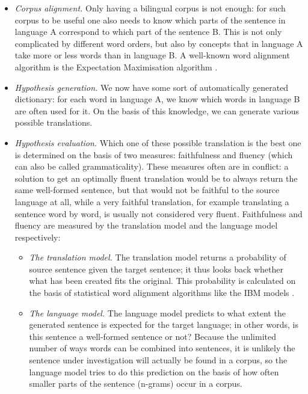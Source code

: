 \documentclass[12pt]{article}
\begin{document}
\begin{itemize}
\item \emph{Corpus alignment.} Only having a bilingual corpus is not enough: for such corpus to be useful one also needs to know which parts of the sentence in language A correspond to which part of the sentence B. This is not only complicated by different word orders, but also by concepts that in language A take more or less words than in language B. A well-known word alignment algorithm is the Expectation Maximisation algorithm \citep{dempster77}. 


\item \emph{Hypothesis generation.} We now have some sort of automatically generated dictionary: for each word in language A, we know which words in language B are often used for it. On the basis of this knowledge, we can generate various possible translations. 

\item \emph{Hypothesis evaluation.} Which one of these possible translation is the best one is determined on the basis of two measures: faithfulness and fluency (which can also be called grammaticality). These measures often are in conflict: a solution to get an optimally fluent translation would be to always return the same well-formed sentence, but that would not be faithful to the source language at all, while a very faithful translation, for example translating a sentence word by word, is usually not considered very fluent. Faithfulness and fluency are measured by the translation model and the language model respectively:

\begin{itemize}
\item \emph{The translation model.} The translation model returns a probability of source sentence given the target sentence; it thus looks back whether what has been created fits the original. This probability is calculated on the basis of statistical word alignment algorithms like the IBM models \citep{brown93}.

\item \emph{The language model.} The language model predicts to what extent the generated sentence is expected for the target language; in other words, is this sentence a well-formed sentence or not? Because the unlimited number of ways words can be combined into sentences, it is unlikely the sentence under investigation will actually be found in a corpus, so the language model tries to do this prediction on the basis of how often smaller parts of the sentence (n-grams) occur in a corpus.

\end{itemize}

\end{itemize}
\end{document}
